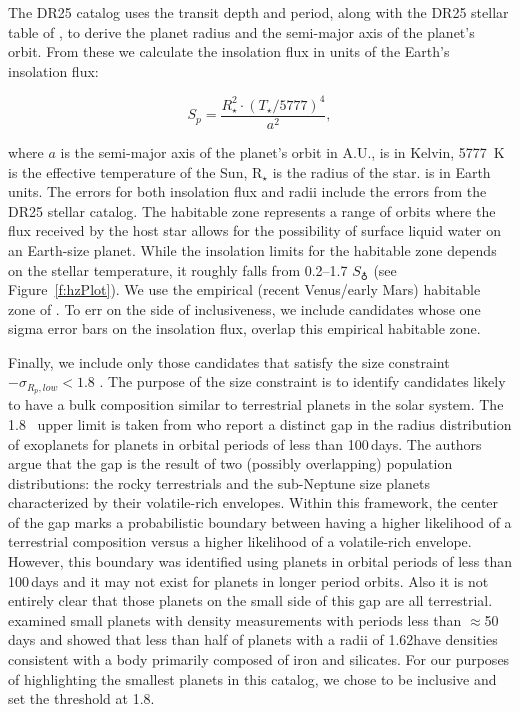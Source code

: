 The DR25 catalog uses the transit depth and period, along with the DR25 stellar table of \citet{Mathur2017ApJS}, to derive the planet radius and the semi-major axis of the planet's orbit.  From these we calculate the insolation flux in units of the Earth's insolation flux:

\begin{equation}
S_{p} = \frac{R_{\star}^{2} \cdot (T_{\star}/5777)^{4}}{a^{2}} ,
\end{equation}

\noindent where $a$ is the semi-major axis of the planet's orbit in A.U., \tstar{} is in Kelvin, 5777~K is the effective temperature of the Sun, R$_{\star}$ is the radius of the star. \sp{} is in Earth units. The errors for both insolation flux and radii include the errors from the DR25 stellar catalog. The habitable zone represents a range of orbits where the flux received by the host star allows for the possibility of surface liquid water on an Earth-size planet.  While the insolation limits for the habitable zone depends on the stellar temperature, it roughly falls from 0.2--1.7 $S_{\earth}$ (see Figure~\ref{f:hzPlot}). We use the empirical (recent Venus/early Mars) habitable zone of \citet{Kopparapu2013}.  To err on the side of inclusiveness, we include candidates whose one sigma error bars on the insolation flux, overlap this empirical habitable zone.  

Finally, we include only those candidates that satisfy the size constraint \rp $- \sigma_{{R_p},low} < 1.8$ \re.  The purpose of the size constraint is to identify candidates likely to have a bulk composition similar to terrestrial planets in the solar system.  The 1.8 \re\ upper limit is taken from \citet{Fulton2017} who report a distinct gap in the radius distribution of exoplanets for planets in orbital periods of less than 100\,days.  The authors argue that the gap is the result of two (possibly overlapping) population distributions: the rocky terrestrials and the sub-Neptune size planets characterized by their volatile-rich envelopes.  Within this framework, the center of the gap marks a probabilistic boundary between having a higher likelihood of a terrestrial composition versus a higher likelihood of a volatile-rich envelope.  
{\color{blue}  However, this boundary was identified using planets in orbital periods of less than 100\,days and it may not exist for planets in longer period orbits. Also it is not entirely clear that those planets on the small side of this gap are all terrestrial. \citet{Rogers2015} examined small planets with density measurements with periods less than $\approx$50 days and showed that less than half of planets with a radii of 1.62\re have densities consistent with a body primarily composed of iron and silicates.  For our purposes of highlighting the smallest planets in this catalog, we chose to be inclusive and set the threshold at 1.8\re.
}

